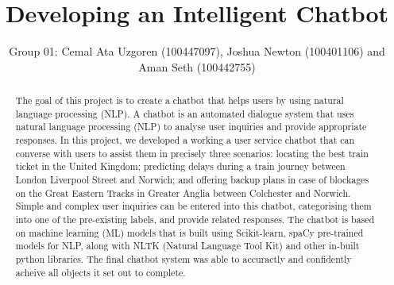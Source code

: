 \documentclass[11pt]{article}
\title{Developing an Intelligent Chatbot}
\author{Group 01: Cemal Ata Uzgoren (100447097), Joshua Newton (100401106) and Aman Seth (100442755)}
\begin{document}
\maketitle

\tableofcontents
\newpage

\begin{abstract}
The goal of this project is to create a chatbot that helps users by using natural language processing (NLP). A chatbot is an automated dialogue system that uses natural language processing (NLP) to analyse user inquiries and provide appropriate responses. %
In this project, we developed a working a user service chatbot that can converse with users to assist them in precisely three scenarios: locating the best train ticket in the United Kingdom; predicting delays during a train journey between London Liverpool Street and Norwich; and offering backup plans in case of blockages on the Great Eastern Tracks in Greater Anglia between Colchester and Norwich. Simple and complex user inquiries can be entered into this chatbot, categorising them into one of the pre-existing labels, and provide related responses. The chatbot is based on machine learning (ML) models that is built using Scikit-learn, spaCy pre-trained models for NLP, along with NLTK (Natural  Language  Tool  Kit) and other in-built python libraries. The final chatbot system was able to accuractly and confidently acheive all objects it set out to complete.

\end{abstract}









\newpage

%
 

\newpage

\end{document}
